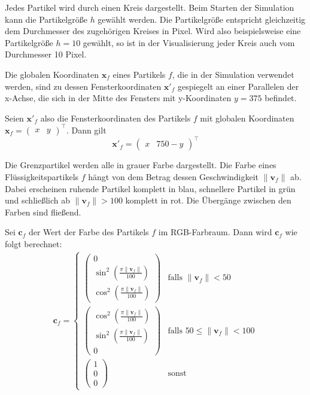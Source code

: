 \documentclass{scrreprt}
\begin{document}
Jedes Partikel wird durch einen Kreis dargestellt.
Beim Starten der Simulation kann die Partikelgröße $h$ gewählt werden.
Die Partikelgröße entspricht gleichzeitig dem Durchmesser des zugehörigen Kreises in Pixel.
Wird also beispielsweise eine Partikelgröße $h = 10$ gewählt, so ist in der Visualisierung jeder Kreis auch vom Durchmesser 10 Pixel.

Die globalen Koordinaten $\textbf{x}_f$ eines Partikels $f$,
die in der Simulation verwendet werden,
sind zu dessen Fensterkoordinaten $\textbf{x}'_f$ gespiegelt an einer Parallelen der x-Achse,
die sich in der Mitte des Fensters mit y-Koordinaten $y = 375$ befindet.

Seien $\textbf{x}'_f$ also die Fensterkoordinaten des Partikels $f$ mit globalen Koordinaten $\textbf{x}_f = \begin{pmatrix} x & y \end{pmatrix}^\intercal$.
Dann gilt
\begin{equation}
    \textbf{x}'_f = \begin{pmatrix}
        x & 750 - y
    \end{pmatrix}^\intercal
\end{equation}

Die Grenzpartikel werden alle in grauer Farbe dargestellt.
Die Farbe eines Flüssigkeitspartikels $f$ hängt von dem Betrag dessen Geschwindigkeit $\| \textbf{v}_f \|$ ab.
Dabei erscheinen ruhende Partikel komplett in blau, schnellere Partikel in grün und schließlich ab $\| \textbf{v}_f \| > 100$ komplett in rot.
Die Übergänge zwischen den Farben sind fließend.

Sei $\textbf{c}_f$ der Wert der Farbe des Partikels $f$ im RGB-Farbraum.
Dann wird $\textbf{c}_f$ wie folgt berechnet:
\begin{align}
    \textbf{c}_f = \begin{cases}
        \begin{pmatrix}
            0\\
            \sin^2(\frac{\pi \|\textbf{v}_f\|}{100})\\
            \cos^2(\frac{\pi \|\textbf{v}_f\|}{100})
        \end{pmatrix}
        & \text{falls } \|\textbf{v}_f\| < 50\\[25pt]
        \begin{pmatrix}
            \cos^2(\frac{\pi \|\textbf{v}_f\|}{100})\\
            \sin^2(\frac{\pi \|\textbf{v}_f\|}{100})\\
            0
        \end{pmatrix}
        & \text{falls } 50 \leq \|\textbf{v}_f\| < 100\\[25pt]
        \begin{pmatrix}
            1\\
            0\\
            0
        \end{pmatrix}
        & \text{sonst}
    \end{cases}
\end{align}
\end{document}
